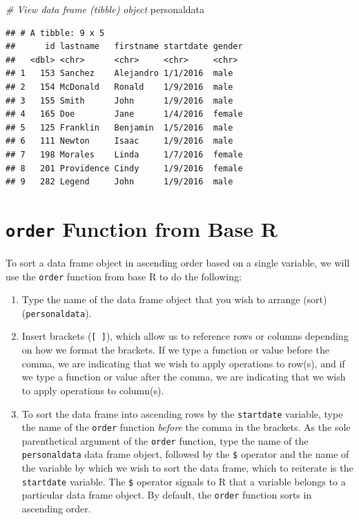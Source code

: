 \documentclass[]{book}
\newenvironment{Shaded}{\begin{snugshade}}{\end{snugshade}}
\newcommand{\CommentTok}[1]{\textcolor[rgb]{0.56,0.35,0.01}{\textit{#1}}}
\newcommand{\NormalTok}[1]{#1}
\providecommand{\tightlist}{%
  \setlength{\itemsep}{0pt}\setlength{\parskip}{0pt}}
\begin{document}
\begin{Shaded}
\begin{Highlighting}[]
\CommentTok{# View data frame (tibble) object}
\NormalTok{personaldata}
\end{Highlighting}
\end{Shaded}

\begin{verbatim}
## # A tibble: 9 x 5
##      id lastname   firstname startdate gender
##   <dbl> <chr>      <chr>     <chr>     <chr> 
## 1   153 Sanchez    Alejandro 1/1/2016  male  
## 2   154 McDonald   Ronald    1/9/2016  male  
## 3   155 Smith      John      1/9/2016  male  
## 4   165 Doe        Jane      1/4/2016  female
## 5   125 Franklin   Benjamin  1/5/2016  male  
## 6   111 Newton     Isaac     1/9/2016  male  
## 7   198 Morales    Linda     1/7/2016  female
## 8   201 Providence Cindy     1/9/2016  female
## 9   282 Legend     John      1/9/2016  male
\end{verbatim}

\section*{\texorpdfstring{\texttt{order} Function from Base
R}{order Function from Base R}}\label{arrange_supp}

To sort a data frame object in ascending order based on a single
variable, we will use the \texttt{order} function from base R to do the
following:

\begin{enumerate}
\def\labelenumi{\arabic{enumi}.}
\tightlist
\item
  Type the name of the data frame object that you wish to arrange (sort)
  (\texttt{personaldata}).
\item
  Insert brackets (\texttt{{[}\ {]}}), which allow us to reference rows
  or columns depending on how we format the brackets. If we type a
  function or value before the comma, we are indicating that we wish to
  apply operations to row(s), and if we type a function or value after
  the comma, we are indicating that we wish to apply operations to
  column(s).
\item
  To sort the data frame into ascending rows by the \texttt{startdate}
  variable, type the name of the \texttt{order} function \emph{before}
  the comma in the brackets. As the sole parenthetical argument of the
  \texttt{order} function, type the name of the \texttt{personaldata}
  data frame object, followed by the \texttt{\$} operator and the name
  of the variable by which we wish to sort the data frame, which to
  reiterate is the \texttt{startdate} variable. The \texttt{\$} operator
  signals to R that a variable belongs to a particular data frame
  object. By default, the \texttt{order} function sorts in ascending
  order.
\end{enumerate}
\end{document}

